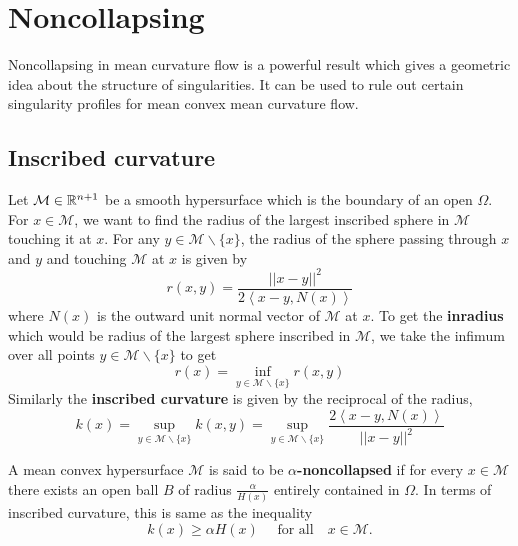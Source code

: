 \chapter{Noncollapsing}

Noncollapsing in mean curvature flow is a powerful result which gives a geometric idea about the structure of singularities. It can be used to rule out certain singularity profiles for mean convex mean curvature flow. 

\section{Inscribed curvature}

Let $ \mathcal{M} \in \mathbb{R}^{n+1} $ be a smooth hypersurface which is the boundary of an open $ \Omega $. For $ x \in \mathcal{M} $, we want to find the radius of the largest inscribed sphere in $ \mathcal{M} $ touching it at $ x $. For any $ y \in \mathcal{M}\backslash \{x\} $, the radius of the sphere passing through $ x $ and $ y $ and touching $ \mathcal{M} $ at $ x $ is given by \begin{equation}
    r(x,y) = \frac{||x-y||^{2}}{2\left< x-y,N(x) \right>}
\end{equation}
where $ N(x) $ is the outward unit normal vector of $ \mathcal{M} $ at $ x $. To get the \textbf{inradius} which would be radius of the largest sphere inscribed in $ \mathcal{M} $, we take the infimum over all points $ y \in \mathcal{M}\backslash \{x\} $ to get \begin{equation}
    r(x) = \inf_{{y \in \mathcal{M}\backslash \{x\}}} r(x,y)
\end{equation}
Similarly the \textbf{inscribed curvature}  is given by the reciprocal of the radius, \begin{equation}
    k(x) = \sup_{y \in \mathcal{M}\backslash \{x\}}k(x,y) = \sup_{y \in \mathcal{M}\backslash \{x\}} \frac{2\left< x-y,N(x) \right>}{||x-y||^{2}}
\end{equation}

\begin{defn}
    A mean convex hypersurface $ \mathcal{M} $ is said to be \textbf{$ \alpha $-noncollapsed}   if for every $ x \in \mathcal{M} $ there exists an open ball $ B $ of radius $ \frac{\alpha}{H(x)} $ entirely contained in $ \Omega $. In terms of inscribed curvature, this is same as the inequality \begin{equation}
        k(x) \ge \alpha H(x) \quad \text{ for all} \quad x \in \mathcal{M}.
    \end{equation}
\end{defn}


